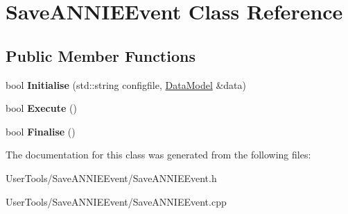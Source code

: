 \hypertarget{classSaveANNIEEvent}{
\section{SaveANNIEEvent Class Reference}
\label{classSaveANNIEEvent}
}
\subsection*{Public Member Functions}
\begin{DoxyCompactItemize}
\item 
\hypertarget{classSaveANNIEEvent_a7b9e87736d43d8445461f4e50d36e759}{
bool {\bfseries Initialise} (std::string configfile, \hyperlink{classDataModel}{DataModel} \&data)}
\label{classSaveANNIEEvent_a7b9e87736d43d8445461f4e50d36e759}

\item 
\hypertarget{classSaveANNIEEvent_a54da8199880cd8655b9b177c96df2b04}{
bool {\bfseries Execute} ()}
\label{classSaveANNIEEvent_a54da8199880cd8655b9b177c96df2b04}

\item 
\hypertarget{classSaveANNIEEvent_a258f70640d20f542fd51805c6f564b45}{
bool {\bfseries Finalise} ()}
\label{classSaveANNIEEvent_a258f70640d20f542fd51805c6f564b45}

\end{DoxyCompactItemize}


The documentation for this class was generated from the following files:\begin{DoxyCompactItemize}
\item 
UserTools/SaveANNIEEvent/SaveANNIEEvent.h\item 
UserTools/SaveANNIEEvent/SaveANNIEEvent.cpp\end{DoxyCompactItemize}
